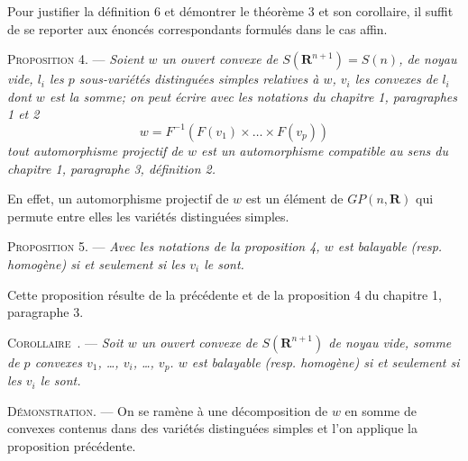 \documentclass[11pt]{article}
\newcommand{\R}{\boldsymbol{R}}
\newcommand{\bzcf}[2]{#1}
\newcommand{\bznum}[1]{\if\relax\detokenize{#1}\relax\else\ #1\fi}
\newenvironment{prop}[1][]{\par\medskip\noindent\textsc{Proposition #1.} --- \itshape}{\par\medskip}
\newenvironment{corollaire}[1][]{\par\medskip\noindent\textsc{Corollaire\bznum{#1}.} --- \itshape}{\par\medskip}
\newenvironment{proof}[1][]{\par}{\par}
\begin{document}
\begin{proof}
Pour justifier \bzcf{la définition 6}{\ref{bzdef:c3s2d6_distingue_projectif}} et démontrer
\bzcf{le théorème 3}{\ref{bzthm:c3s2t3_algebre_boole_projective}} et son corollaire, il suffit
de se reporter aux énoncés correspondants formulés dans le cas affin.
\end{proof}

\begin{prop}[4]
Soient $w$ un ouvert convexe de $S(\R^{n+1})=S(n)$, de noyau vide, $l_i$ les $p$ sous-variétés
distinguées simples relatives à $w$, $v_i$ les convexes de $l_i$ dont $w$ est la somme; on peut
écrire avec les notations du chapitre 1, paragraphes 1 et 2
\[ w=F^{-1}(F(v_1)\times\ldots\times F(v_p)) \]
tout automorphisme projectif de $w$ est un automorphisme compatible au sens du \bzcf{chapitre 1,
paragraphe 3, définition 2}{\ref{bzdef:c1s3d2_automorphisme_compatible}}.
\end{prop}

\begin{proof}
En effet, un automorphisme projectif de $w$ est un élément de $GP(n, \R)$ qui permute entre elles
les variétés distinguées simples.
\end{proof}

\begin{prop}[5]
Avec les notations de \bzcf{la proposition 4}{\ref{bzprop:c3s2p4_automorphisme_compatible}}, $w$
est balayable (resp. homogène) si et seulement si les $v_i$ le sont.
\end{prop}

\begin{proof}
Cette proposition résulte de \bzcf{la précédente}{\ref{bzprop:c3s2p4_automorphisme_compatible}}
et de \bzcf{la proposition 4 du chapitre 1, paragraphe 3}{\ref{bzprop:c1s3p4_reciproque}}.
\end{proof}

\begin{corollaire}
Soit $w$ un ouvert convexe de $S(\R^{n+1})$ de noyau vide, somme de $p$ convexes $v_1$, \ldots,
$v_i$, \ldots, $v_p$. $w$ est balayable (resp. homogène) si et seulement si les $v_i$ le sont.
\end{corollaire}

\begin{proof}
\textsc{Démonstration.} --- On se ramène à une décomposition de $w$ en somme de convexes contenus
dans des variétés distinguées simples et l'on applique \bzcf{la proposition
précédente}{\ref{bzprop:c3s2p5_balayable_somme}}.
\end{proof}
\end{document}
